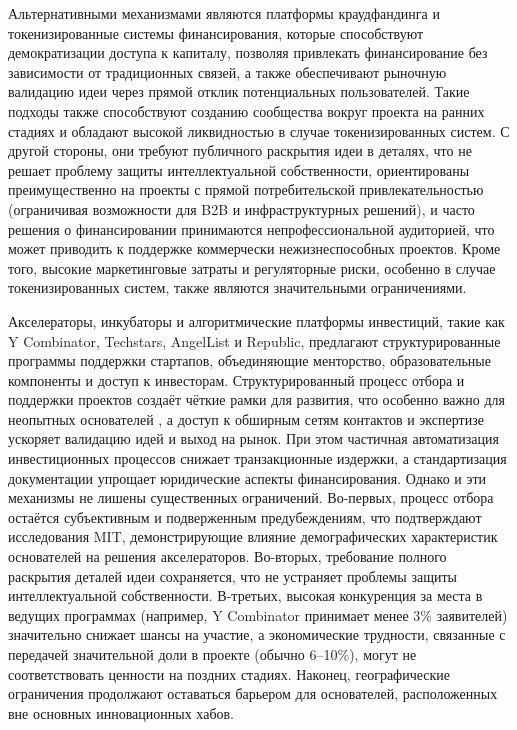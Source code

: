 \documentclass[
    14pt,
    specialist,
    candidate, %
    subf, %
    href,
    dotsinheaders=false
]{disser}
\begin{document}
Альтернативными механизмами являются платформы краудфандинга и токенизированные системы финансирования, которые способствуют демократизации доступа к капиталу, позволяя привлекать финансирование без зависимости от традиционных связей, а также обеспечивают рыночную валидацию идеи через прямой отклик потенциальных пользователей. Такие подходы также способствуют созданию сообщества вокруг проекта на ранних стадиях и обладают высокой ликвидностью в случае токенизированных систем. С другой стороны, они требуют публичного раскрытия идеи в деталях, что не решает проблему защиты интеллектуальной собственности, ориентированы преимущественно на проекты с прямой потребительской привлекательностью (ограничивая возможности для B2B и инфраструктурных решений), и часто решения о финансировании принимаются непрофессиональной аудиторией, что может приводить к поддержке коммерчески нежизнеспособных проектов. Кроме того, высокие маркетинговые затраты и регуляторные риски, особенно в случае токенизированных систем, также являются значительными ограничениями.

Акселераторы, инкубаторы и алгоритмические платформы инвестиций, такие как Y Combinator, Techstars, AngelList и Republic, предлагают структурированные программы поддержки стартапов, объединяющие менторство, образовательные компоненты и доступ к инвесторам. Структурированный процесс отбора и поддержки проектов создаёт чёткие рамки для развития, что особенно важно для неопытных основателей \cite{thiel2014zero}, а доступ к обширным сетям контактов и экспертизе ускоряет валидацию идей и выход на рынок. При этом частичная автоматизация инвестиционных процессов снижает транзакционные издержки, а стандартизация документации упрощает юридические аспекты финансирования. Однако и эти механизмы не лишены существенных ограничений. Во-первых, процесс отбора остаётся субъективным и подверженным предубеждениям, что подтверждают исследования MIT, демонстрирующие влияние демографических характеристик основателей на решения акселераторов. Во-вторых, требование полного раскрытия деталей идеи сохраняется, что не устраняет проблемы защиты интеллектуальной собственности. В-третьих, высокая конкуренция за места в ведущих программах (например, Y Combinator принимает менее 3\% заявителей) значительно снижает шансы на участие, а экономические трудности, связанные с передачей значительной доли в проекте (обычно 6–10\%), могут не соответствовать ценности на поздних стадиях. Наконец, географические ограничения продолжают оставаться барьером для основателей, расположенных вне основных инновационных хабов.
\end{document}
